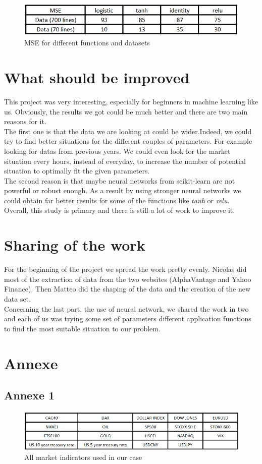 \documentclass[]{article}
\begin{document}
\begin{figure}[hbt!]
	\center{}
	\includegraphics[scale=0.8]{image/results.png}
	\caption{MSE for different functions and datasets}
\end{figure}


\section{What should be improved}
\vskip 0.5cm
This project was very interesting, especially for beginners  in machine learning like us. Obviously, the results we got could be much better and there are two main reasons for it. \\
The first one is that the data we are looking at could be wider.Indeed, we could try to find better situations for the different couples of parameters. For example looking for datas from previous years. We could even look for the market situation every hours, instead of everyday, to increase the number of potential situation to optimally fit the given parameters. \\
The second reason is that maybe neural networks from scikit-learn are not powerful or robust enough. As a result by using stronger neural networks we could obtain far better results for some of the functions like \textit{tanh} or \textit{relu}. \\
Overall, this study is primary and there is still a lot of work to improve it.


\section{Sharing of the work}

\vskip 0.5cm
For the beginning of the project we spread the work pretty evenly.
Nicolas did most of the extraction of data from the two websites (AlphaVantage and Yahoo Finance). 
Then Matteo did the shaping of the data and the creation of the new data set.\\
Concerning the last part, the use of neural network, we shared the work in two and each of us was trying some set of parameters different application functions to find the most suitable situation to our problem.

\section{Annexe}
\subsection{Annexe 1} 
\begin{figure}[hbt!]
	\center{}
	\includegraphics[scale=0.5]{image/marketSituation.png}
	\caption{All market indicators used in our case}
\end{figure}
\end{document}
